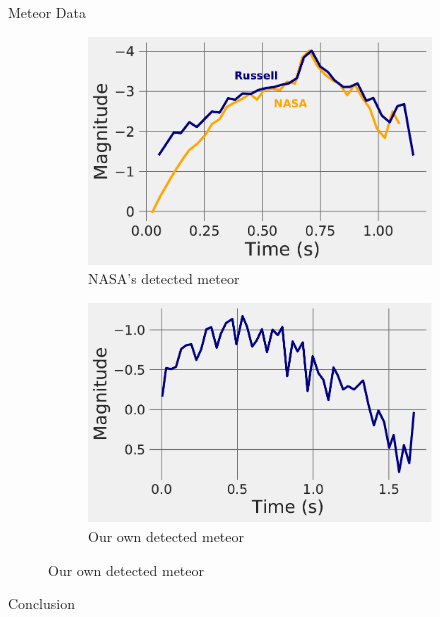 \documentclass[final]{beamer}
\newlength{\twocolwid}
\begin{document}
\begin{frame}[t]
\begin{columns}[t]
\begin{column}{\twocolwid}
\begin{alertblock}{Meteor Data}
\begin{figure}
\centering
\begin{subfigure}{.5\textwidth}
  \centering
  \includegraphics[width=\linewidth]{LightComparison0.pdf}
  \caption{NASA's detected meteor}
  \label{fig:sub1}
\end{subfigure}%
\begin{subfigure}{.5\textwidth}
  \centering
  \includegraphics[width=\linewidth]{D6Curve.pdf}
  \caption{Our own detected meteor}
  \label{fig:sub2}
\end{subfigure}
\label{fig:test}
\end{figure}

\end{alertblock}

\vspace{-1.5cm}


\begin{block}{Conclusion}


\end{block}
\end{column}
\end{columns}
\end{frame}
\end{document}
